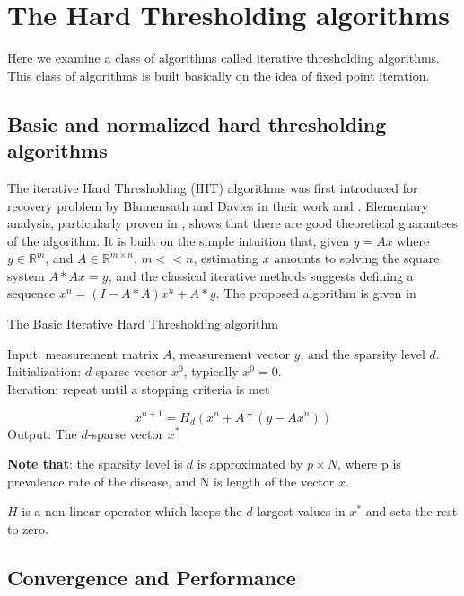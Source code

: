 \section{The Hard Thresholding algorithms}
Here we examine a class of algorithms called  iterative thresholding algorithms. This class of algorithms is built basically on the idea of fixed point iteration.  
\subsection{Basic and normalized hard thresholding algorithms}
  

The iterative Hard Thresholding (IHT) algorithms was first introduced for recovery problem by Blumensath and Davies in their work  \cite{bluemensath} and \cite{bluementh}. Elementary analysis, particularly proven in \cite{analysis}, shows that there are good theoretical guarantees of the algorithm. It is built on the simple intuition that, given $ y = Ax $ where $ y \in \mathbb{R}^m $, and $ A \in \mathbb{R}^{m\times n} $, $ m << n $, estimating $ x $ amounts to solving the square system $ A*Ax = y $, and the classical iterative methods suggests defining a sequence $ x^n  = (I - A*A)x^n + A*y$. The proposed algorithm is given in \cite{mathbook}
\begin{algorithm}
\caption{The Basic Iterative Hard Thresholding algorithm}
Input: measurement matrix $ A $, measurement vector $ y $, and the sparsity level $ d $.\\ 
Initialization: $ d $-sparse vector $ x^0 $, typically $ x^0 = 0 $.\\ 
Iteration: repeat until a stopping criteria is met 

\begin{equation*}\label{key}
x^{n+1} = H_d(x^n+ A* (y - Ax^n))
\end{equation*}
Output: The $ d $-sparse vector $x^*$
\end{algorithm} 

\newpage
\textbf{Note that}: the sparsity level is $ d $ is approximated by $ p \times N $, where p is prevalence rate of the disease, and N is length of the vector $ x $. 

$ H $ is a non-linear operator which keeps the $d$ largest values in $ x^* $ and sets the rest to zero. %

\subsection{Convergence and Performance}

